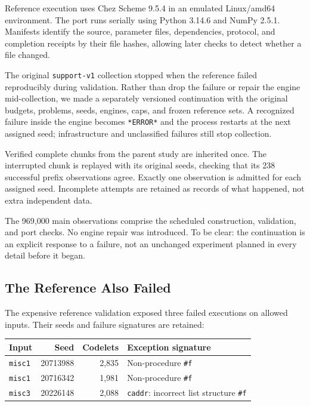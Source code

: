 \documentclass[10pt,letterpaper]{article}
\begin{document}
Reference execution uses Chez Scheme 9.5.4 in an emulated Linux/amd64 environment. The
port runs serially using Python 3.14.6 and NumPy 2.5.1. Manifests identify the source,
parameter files, dependencies, protocol, and completion receipts by their file hashes,
allowing later checks to detect whether a file changed.

The original \texttt{support-v1} collection stopped when the reference failed reproducibly
during validation. Rather than drop the failure or repair the engine mid-collection, we
made a separately versioned continuation with the original budgets, problems, seeds,
engines, caps, and frozen reference sets. A recognized failure inside the engine becomes
\texttt{*ERROR*} and the process restarts at the next assigned seed; infrastructure and
unclassified failures still stop collection.

Verified complete chunks from the parent study are inherited once. The interrupted chunk
is replayed with its original seeds, checking that its 238 successful prefix observations
agree. Exactly one observation is admitted for each assigned seed. Incomplete attempts are
retained as records of what happened, not extra independent data.

The 969,000 main observations comprise the scheduled construction, validation, and port
checks. No engine repair was introduced. To be clear: the continuation is an explicit
response to a failure, not an unchanged experiment planned in every detail before it
began.

\subsection{The Reference Also Failed}\label{sec:reference-failures}

The expensive reference validation exposed three failed executions on allowed inputs.
Their seeds and failure signatures are retained:

{\def\LTcaptype{none} %
\begin{longtable}[]{@{}lrrl@{}}
\toprule\noalign{}
Input & Seed & Codelets & Exception signature \\
\midrule\noalign{}
\endhead
\bottomrule\noalign{}
\endlastfoot
\texttt{misc1} & 20713988 & 2,835 & Non-procedure \texttt{\#f} \\
\texttt{misc1} & 20716342 & 1,981 & Non-procedure \texttt{\#f} \\
\texttt{misc3} & 20226148 & 2,088 & \texttt{caddr}: incorrect list structure
\texttt{\#f} \\
\end{longtable}
}
\end{document}

